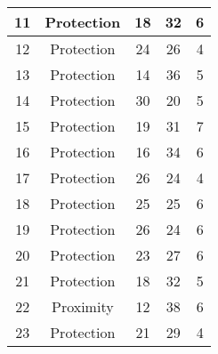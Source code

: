 \documentclass[results.tex]{subfiles}
\begin{document}
\begin{center}
\begin{tabular}{| c || c | c | c | c |}
            \hline
            11                      & Protection                   & 18                     & 32                      & 6                    \\
            \hline
            12                      & Protection                   & 24                     & 26                      & 4                    \\
            \hline
            13                      & Protection                   & 14                     & 36                      & 5                    \\
            \hline
            14                      & Protection                   & 30                     & 20                      & 5                    \\
            \hline
            15                      & Protection                   & 19                     & 31                      & 7                    \\
            \hline
            16                      & Protection                   & 16                     & 34                      & 6                    \\
            \hline
            17                      & Protection                   & 26                     & 24                      & 4                    \\
            \hline
            18                      & Protection                   & 25                     & 25                      & 6                    \\
            \hline
            19                      & Protection                   & 26                     & 24                      & 6                    \\
            \hline
            20                      & Protection                   & 23                     & 27                      & 6                    \\
            \hline
            21                      & Protection                   & 18                     & 32                      & 5                    \\
            \hline
            22                      & Proximity                    & 12                     & 38                      & 6                    \\
            \hline
            23                      & Protection                   & 21                     & 29                      & 4                    \\

\end{tabular}
\end{center}
\end{document}
